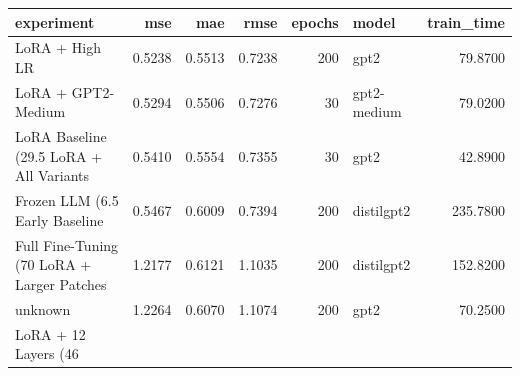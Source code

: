 \begin{tabular}{lrrrrlr}
\toprule
experiment & mse & mae & rmse & epochs & model & train_time \\
\midrule
LoRA + High LR & 0.5238 & 0.5513 & 0.7238 & 200 & gpt2 & 79.8700 \\
LoRA + GPT2-Medium & 0.5294 & 0.5506 & 0.7276 & 30 & gpt2-medium & 79.0200 \\
LoRA Baseline (29.5%
LoRA + All Variants & 0.5410 & 0.5554 & 0.7355 & 30 & gpt2 & 42.8900 \\
Frozen LLM (6.5%
Early Baseline & 0.5467 & 0.6009 & 0.7394 & 200 & distilgpt2 & 235.7800 \\
Full Fine-Tuning (70%
LoRA + Larger Patches & 1.2177 & 0.6121 & 1.1035 & 200 & distilgpt2 & 152.8200 \\
unknown & 1.2264 & 0.6070 & 1.1074 & 200 & gpt2 & 70.2500 \\
LoRA + 12 Layers (46%
\bottomrule
\end{tabular}
